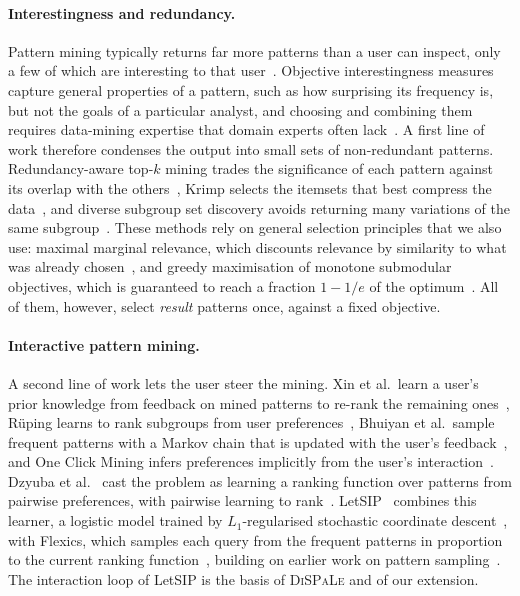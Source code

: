 \documentclass[sigconf]{acmart}
\begin{document}
\paragraph{Interestingness and redundancy.}
Pattern mining typically returns far more patterns than a user can inspect, only a few of which are interesting to that user~\cite{xin2006}. Objective interestingness measures~\cite{geng2006} capture general properties of a pattern, such as how surprising its frequency is, but not the goals of a particular analyst, and choosing and combining them requires data-mining expertise that domain experts often lack~\cite{dzyuba2014}. A first line of work therefore condenses the output into small sets of non-redundant patterns. Redundancy-aware top-$k$ mining trades the significance of each pattern against its overlap with the others~\cite{xin2006redundancy}, Krimp selects the itemsets that best compress the data~\cite{vreeken2011}, and diverse subgroup set discovery avoids returning many variations of the same subgroup~\cite{vanleeuwen2012}. These methods rely on general selection principles that we also use: maximal marginal relevance, which discounts relevance by similarity to what was already chosen~\cite{carbonell1998}, and greedy maximisation of monotone submodular objectives, which is guaranteed to reach a fraction $1-1/e$ of the optimum~\cite{nemhauser1978}. All of them, however, select \emph{result} patterns once, against a fixed objective.

\paragraph{Interactive pattern mining.}
A second line of work lets the user steer the mining. Xin et al.\ learn a user's prior knowledge from feedback on mined patterns to re-rank the remaining ones~\cite{xin2006}, Rüping learns to rank subgroups from user preferences~\cite{rueping2009}, Bhuiyan et al.\ sample frequent patterns with a Markov chain that is updated with the user's feedback~\cite{bhuiyan2012}, and One Click Mining infers preferences implicitly from the user's interaction~\cite{boley2013}. Dzyuba et al.~\cite{dzyuba2014} cast the problem as learning a ranking function over patterns from pairwise preferences, with pairwise learning to rank~\cite{joachims2002,furnkranz2010}. LetSIP~\cite{dzyuba2017} combines this learner, a logistic model trained by $L_1$-regularised stochastic coordinate descent~\cite{shalevshwartz2011}, with Flexics, which samples each query from the frequent patterns in proportion to the current ranking function~\cite{dzyuba2017}, building on earlier work on pattern sampling~\cite{boley2011,hasan2009}. The interaction loop of LetSIP is the basis of \textsc{DiSPaLe} and of our extension.
\end{document}
